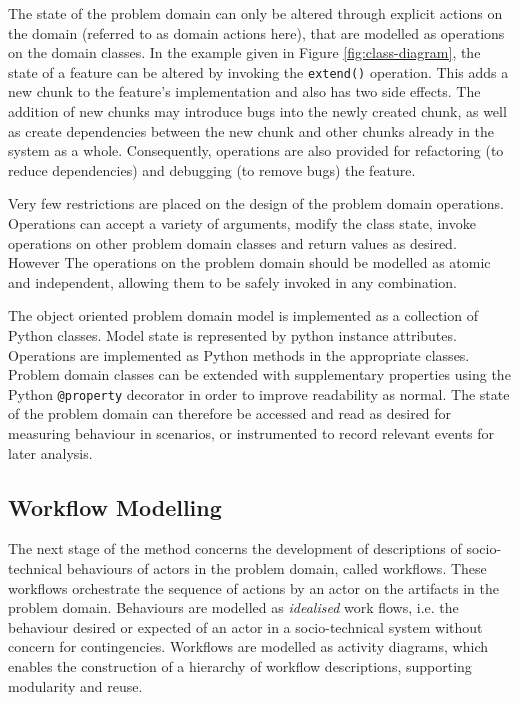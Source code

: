 \documentclass{sig-alternate}
\begin{document}
The state of the problem domain can only be altered through explicit actions on
the domain (referred to as domain actions here), that are modelled as operations
on the domain classes.  In the example given in Figure \ref{fig:class-diagram},
the state of a feature can be altered by invoking the \lstinline!extend()!
operation.  This adds a new chunk to the feature's implementation and also has
two side effects. The addition of new chunks may introduce bugs into the newly
created chunk, as well as create dependencies between the new chunk and other
chunks already in the system as a whole.  Consequently, operations are also
provided for refactoring (to reduce dependencies) and debugging (to remove bugs)
the feature.

Very few restrictions are placed on the design of the problem domain operations.
Operations can accept a variety of arguments, modify the class state, invoke
operations on other problem domain classes and return values as desired.
However The operations on the problem domain should be modelled as atomic and
independent, allowing them to be safely invoked in any combination.

The object oriented problem domain model is implemented as a collection of
Python classes.  Model state is represented by python instance attributes.
Operations are implemented as Python methods in the appropriate classes.
Problem domain classes can be extended with supplementary properties using the
Python \lstinline!@property! decorator in order to improve readability as
normal.  The state of the problem domain can therefore be accessed and read as
desired for measuring behaviour in scenarios, or instrumented to record relevant
events for later analysis.


\subsection{Workflow Modelling}


The next stage of the method concerns the development of descriptions of
socio-technical behaviours of actors in the problem domain, called workflows.
These workflows orchestrate the sequence of actions by an actor on the artifacts
in the problem domain.  Behaviours are modelled as \emph{idealised} work flows,
i.e. the behaviour desired or expected of an actor in a socio-technical system
without concern for contingencies.  Workflows are modelled as activity diagrams,
which enables the construction of a hierarchy of workflow descriptions,
supporting modularity and reuse.
\end{document}

